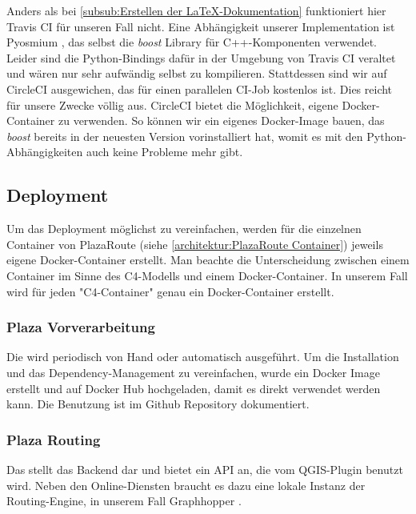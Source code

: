Anders als bei \ref{subsub:Erstellen der LaTeX-Dokumentation} funktioniert hier Travis CI für unseren Fall nicht. Eine Abhängigkeit unserer Implementation ist Pyosmium \cite{pyosmium}, das selbst die \emph{boost} Library für C++-Komponenten verwendet. Leider sind die Python-Bindings dafür in der Umgebung von Travis CI veraltet und wären nur sehr aufwändig selbst zu kompilieren. Stattdessen sind wir auf CircleCI \cite{circleci} ausgewichen, das für einen parallelen \ac{CI}-Job kostenlos ist. Dies reicht für unsere Zwecke völlig aus. CircleCI bietet die Möglichkeit, eigene Docker-Container zu verwenden. So können wir ein eigenes Docker-Image bauen, das \emph{boost} bereits in der neuesten Version vorinstalliert hat, womit es mit den Python-Abhängigkeiten auch keine Probleme mehr gibt.

\subsection{Deployment}
\label{sub:Deployment}

Um das Deployment möglichst zu vereinfachen, werden für die einzelnen Container von PlazaRoute (siehe \ref{architektur:PlazaRoute Container}) jeweils eigene Docker-Container erstellt. Man beachte die Unterscheidung zwischen einem Container im Sinne des C4-Modells \cite{c4model} und einem Docker-Container. In unserem Fall wird für jeden "C4-Container" genau ein Docker-Container erstellt.

\subsubsection{Plaza Vorverarbeitung}
\label{deployment:Plaza Vorverarbeitung}

Die  wird periodisch von Hand oder automatisch ausgeführt. Um die Installation und das Dependency-Management zu vereinfachen, wurde ein Docker Image erstellt und auf Docker Hub \cite{dockerhub:plazaroute} hochgeladen, damit es direkt verwendet werden kann. Die Benutzung ist im Github Repository \cite{github:PlazaRoute} dokumentiert.

\subsubsection{Plaza Routing}
\label{deployment:Plaza Routing}

Das  stellt das Backend dar und bietet ein API an, die vom QGIS-Plugin benutzt wird. Neben den Online-Diensten braucht es dazu eine lokale Instanz der Routing-Engine, in unserem Fall Graphhopper \cite{graphhopper}.

